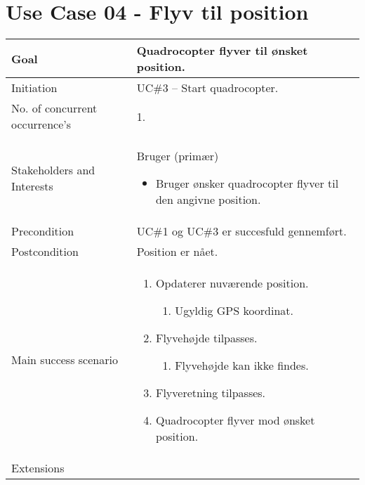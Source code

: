 \section{Use Case 04 - Flyv til position}

\begin{table}[H]
\begin{tabular}{|l|p{10cm}|}
\hline

Goal	 								& Quadrocopter flyver til ønsket position. \\\hline
Initiation 							& UC\#3 – Start quadrocopter. \\\hline
No. of concurrent occurrence’s		& 1. \\\hline
Stakeholders	and Interests			& Bruger (primær) 
										\begin{itemize}
											\item Bruger ønsker quadrocopter flyver til den angivne position.
										\end{itemize} \\\hline
Precondition							& UC\#1 og UC\#3 er succesfuld gennemført. \\\hline
Postcondition						& Position er nået. \\\hline
Main success scenario				&
 
									\renewcommand{\labelenumi}{\arabic{enumi}.}
									\renewcommand{\labelenumii}{\Roman{enumii}:}

									\begin{enumerate}[topsep=0.0cm, leftmargin=0.5cm]
										\item Opdaterer nuværende position.
											\begin{enumerate}[partopsep=4cm, topsep=0cm, leftmargin=1cm]
												\item Ugyldig GPS koordinat.
											\end{enumerate}
										\item Flyvehøjde tilpasses.
											\begin{enumerate}[partopsep=4cm, topsep=0cm, leftmargin=1cm]
												\item Flyvehøjde kan ikke findes.
											\end{enumerate}
										\item Flyveretning tilpasses.
										\item Quadrocopter flyver mod ønsket position.
									\end{enumerate} \\\hline	

Extensions							& 


\end{tabular}
\end{table}
